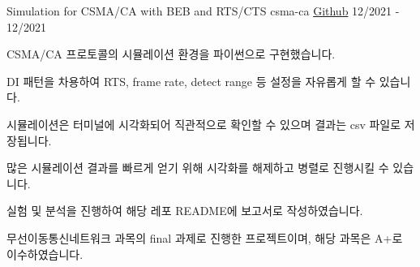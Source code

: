 \cventry
{Simulation for CSMA/CA with BEB and RTS/CTS}
{csma-ca}
{\href{https://github.com/hanchchch/csma-ca}{Github}}
{12/2021 - 12/2021}
\begin{cvitems}
\item {CSMA/CA 프로토콜의 시뮬레이션 환경을 파이썬으로 구현했습니다.}
\item {DI 패턴을 차용하여 RTS, frame rate, detect range 등 설정을 자유롭게 할 수 있습니다.}
\item {시뮬레이션은 터미널에 시각화되어 직관적으로 확인할 수 있으며 결과는 csv 파일로 저장됩니다.}
\item {많은 시뮬레이션 결과를 빠르게 얻기 위해 시각화를 해제하고 병렬로 진행시킬 수 있습니다.}
\item {실험 및 분석을 진행하여 해당 레포 README에 보고서로 작성하였습니다.}
\item {무선이동통신네트워크 과목의 final 과제로 진행한 프로젝트이며, 해당 과목은 A+로 이수하였습니다.}
\end{cvitems}
